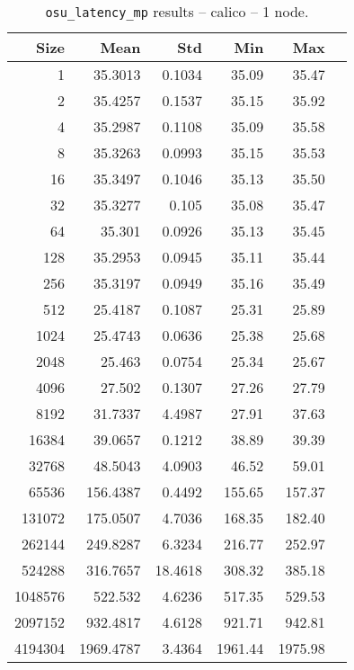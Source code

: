 \begin{table}[htbp]
  \centering
  \begin{minipage}{.48\textwidth}
    \centering
    \footnotesize
  \begin{tabular}{rrrrrr}
	\toprule
	\textbf{Size} & \textbf{Mean} & \textbf{Std} & \textbf{Min} & \textbf{Max}	\\
	\midrule
	1	&	35.3013   	&	0.1034	&	35.09	&	35.47	\\
	2	&	35.4257   	&	0.1537	&	35.15	&	35.92	\\
	4	&	35.2987   	&	0.1108	&	35.09	&	35.58	\\
	8	&	35.3263   	&	0.0993	&	35.15	&	35.53	\\
	16	&	35.3497   	&	0.1046	&	35.13	&	35.50	\\
	32	&	35.3277   	&	0.105	&	35.08	&	35.47	\\
	64	&	35.301   	&	0.0926	&	35.13	&	35.45	\\
	128	&	35.2953   	&	0.0945	&	35.11	&	35.44	\\
	256	&	35.3197   	&	0.0949	&	35.16	&	35.49	\\
	512	&	25.4187   	&	0.1087	&	25.31	&	25.89	\\
	1024	&	25.4743   	&	0.0636	&	25.38	&	25.68	\\
	2048	&	25.463   	&	0.0754	&	25.34	&	25.67	\\
	4096	&	27.502   	&	0.1307	&	27.26	&	27.79	\\
	8192	&	31.7337   	&	4.4987	&	27.91	&	37.63	\\
	16384	&	39.0657   	&	0.1212	&	38.89	&	39.39	\\
	32768	&	48.5043   	&	4.0903	&	46.52	&	59.01	\\
	65536	&	156.4387   	&	0.4492	&	155.65	&	157.37	\\
	131072	&	175.0507   	&	4.7036	&	168.35	&	182.40	\\
	262144	&	249.8287   	&	6.3234	&	216.77	&	252.97	\\
	524288	&	316.7657   	&	18.4618	&	308.32	&	385.18	\\
	1048576	&	522.532   	&	4.6236	&	517.35	&	529.53	\\
	2097152	&	932.4817   	&	4.6128	&	921.71	&	942.81	\\
	4194304	&	1969.4787   	&	3.4364	&	1961.44	&	1975.98	\\
	\bottomrule
	\end{tabular}
  \caption{\texttt{osu\_latency\_mp} results -- calico -- 1 node.}
  \label{tab:latency-mp-calico-1nodes}
  \end{minipage}

\end{table}
